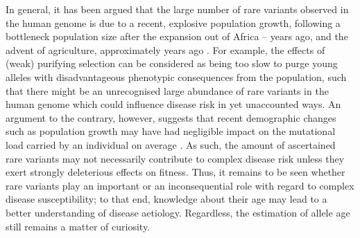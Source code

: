 In general, it has been argued that the large number of rare variants observed in the human genome is due to a recent, explosive population growth, following a bottleneck population size after the expansion out of Africa -- years ago, and the advent of agriculture, approximately  years ago \citep{Coventry:2010cqa,Keinan:2012kl,Tennessen:2012ck}.
For example, the effects of (weak) purifying selection can be considered as being too slow to purge young alleles with disadvantageous phenotypic consequences from the population, such that there might be an unrecognised large abundance of rare variants in the human genome which could influence disease risk in yet unaccounted ways.
An argument to the contrary, however, suggests that recent demographic changes such as population growth may have had negligible impact on the mutational load carried by an individual on average \citep{Simons:2014fj}.
As such, the amount of ascertained rare variants may not necessarily contribute to complex disease risk unless they exert strongly deleterious effects on fitness.
Thus, it remains to be seen whether rare variants play an important or an inconsequential role with regard to complex disease susceptibility; to that end, knowledge about their age may lead to a better understanding of disease aetiology.
Regardless, the estimation of allele age still remains a matter of curiosity.
